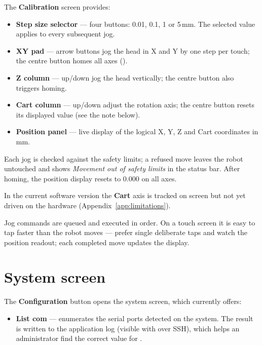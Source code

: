 The \textbf{Calibration} screen provides:

\begin{itemize}[itemsep=2pt]
  \item \textbf{Step size selector} --- four buttons: 0.01, 0.1, 1 or 5\,mm.
        The selected value applies to every subsequent jog.
  \item \textbf{XY pad} --- arrow buttons jog the head in X and Y by one step per
        touch; the centre button homes all axes ().
  \item \textbf{Z column} --- up/down jog the head vertically; the centre button
        also triggers homing.
  \item \textbf{Cart column} --- up/down adjust the rotation axis; the centre
        button resets its displayed value (see the note below).
  \item \textbf{Position panel} --- live display of the logical X, Y, Z and Cart
        coordinates in mm.
\end{itemize}

Each jog is checked against the safety limits; a refused move leaves the robot
untouched and shows \emph{Movement out of safety limits} in the status bar.
After homing, the position display resets to $0.000$ on all axes.

\begin{note}
In the current software version the \textbf{Cart} axis is tracked on screen but not
yet driven on the hardware (Appendix~\ref{app:limitations}).
\end{note}

\begin{tip}
Jog commands are queued and executed in order. On a touch screen it is easy to tap
faster than the robot moves --- prefer single deliberate taps and watch the position
readout; each completed move updates the display.
\end{tip}

\section{System screen}
\label{sec:systemscreen}

The \textbf{Configuration} button opens the system screen, which currently offers:

\begin{itemize}[itemsep=2pt]
  \item \textbf{List com} --- enumerates the serial ports detected on the system.
        The result is written to the application log (visible with
         over SSH), which helps an administrator find
        the correct  value for .
\end{itemize}
